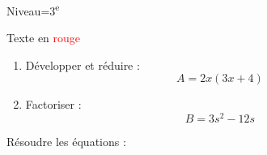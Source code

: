 \documentclass[11pt]{article}
\begin{document}
\begin{multicols}{2}

\begin{Maquette}[Fiche]{Niveau=3\textsuperscript{e}}

\begin{exercice}
Texte en \textcolor{red}{rouge}
\end{exercice}

\begin{exercice}
\begin{enumerate}
    \item{} Développer et réduire :
    \[A=2x(3x+4)\]
    \item{} Factoriser :
    \[B=3s^2-12s\]
\end{enumerate}
\end{exercice}

\begin{exercice}
Résoudre les équations :
\end{exercice}
\end{Maquette}
\end{multicols}
\end{document}
